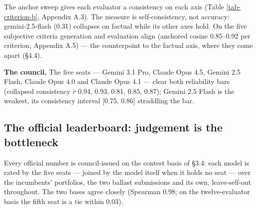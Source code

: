 \documentclass{article}
\begin{document}
The anchor sweep gives each evaluator a consistency on each axis (Table \ref{tab-criterion-b}, Appendix A.3). The measure is self-consistency, not accuracy: gemini-2.5-flash (0.31) collapses on factual while its other axes hold. On the five subjective criteria generation and evaluation align (anchored cosine 0.85--0.92 per criterion, Appendix A.5) --- the counterpoint to the factual axis, where they come apart (\S{}4.4).

\textbf{The council.} The five seats --- Gemini 3.1 Pro, Claude Opus 4.5, Gemini 2.5 Flash, Claude Opus 4.0 and Claude Opus 4.1 --- clear both reliability bars (collapsed consistency \(\bar r\) 0.94, 0.93, 0.81, 0.85, 0.87); Gemini 2.5 Flash is the weakest, its consistency interval {[}0.75, 0.86{]} straddling the bar.

\subsection{The official leaderboard: judgement is the bottleneck}\label{the-official-leaderboard-judgement-is-the-bottleneck}

Every official number is council-issued on the contest basis of \S{}3.4: each model is rated by the five seats --- joined by the model itself when it holds no seat --- over the incumbents' portfolios, the two ballast submissions and its own, leave-self-out throughout. The two bases agree closely (Spearman 0.98; on the twelve-evaluator basis the fifth seat is a tie within 0.03).
\end{document}
